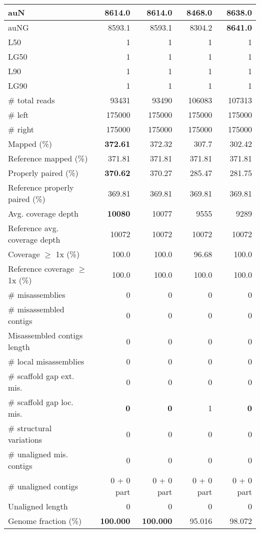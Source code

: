 \documentclass[12pt,a4paper]{article}
\begin{document}
\begin{table}[ht]
\begin{center}
\begin{tabular}{|l*{4}{|r}|}
auN & 8614.0 & 8614.0 & 8468.0 & {\bf 8638.0} \\ \hline
auNG & 8593.1 & 8593.1 & 8304.2 & {\bf 8641.0} \\ \hline
L50 & 1 & 1 & 1 & 1 \\ \hline
LG50 & 1 & 1 & 1 & 1 \\ \hline
L90 & 1 & 1 & 1 & 1 \\ \hline
LG90 & 1 & 1 & 1 & 1 \\ \hline
\# total reads & 93431 & 93490 & 106083 & 107313 \\ \hline
\# left & 175000 & 175000 & 175000 & 175000 \\ \hline
\# right & 175000 & 175000 & 175000 & 175000 \\ \hline
Mapped (\%) & {\bf 372.61} & 372.32 & 307.7 & 302.42 \\ \hline
Reference mapped (\%) & 371.81 & 371.81 & 371.81 & 371.81 \\ \hline
Properly paired (\%) & {\bf 370.62} & 370.27 & 285.47 & 281.75 \\ \hline
Reference properly paired (\%) & 369.81 & 369.81 & 369.81 & 369.81 \\ \hline
Avg. coverage depth & {\bf 10080} & 10077 & 9555 & 9289 \\ \hline
Reference avg. coverage depth & 10072 & 10072 & 10072 & 10072 \\ \hline
Coverage $\geq$ 1x (\%) & 100.0 & 100.0 & 96.68 & 100.0 \\ \hline
Reference coverage $\geq$ 1x (\%) & 100.0 & 100.0 & 100.0 & 100.0 \\ \hline
\# misassemblies & 0 & 0 & 0 & 0 \\ \hline
\# misassembled contigs & 0 & 0 & 0 & 0 \\ \hline
Misassembled contigs length & 0 & 0 & 0 & 0 \\ \hline
\# local misassemblies & 0 & 0 & 0 & 0 \\ \hline
\# scaffold gap ext. mis. & 0 & 0 & 0 & 0 \\ \hline
\# scaffold gap loc. mis. & {\bf 0} & {\bf 0} & 1 & {\bf 0} \\ \hline
\# structural variations & 0 & 0 & 0 & 0 \\ \hline
\# unaligned mis. contigs & 0 & 0 & 0 & 0 \\ \hline
\# unaligned contigs & 0 + 0 part & 0 + 0 part & 0 + 0 part & 0 + 0 part \\ \hline
Unaligned length & 0 & 0 & 0 & 0 \\ \hline
Genome fraction (\%) & {\bf 100.000} & {\bf 100.000} & 95.016 & 98.072 \\ \hline

\end{tabular}
\end{center}
\end{table}
\end{document}
